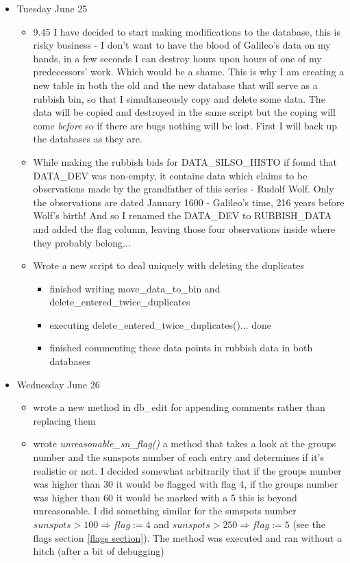 \documentclass[12pt]{article}
\begin{document}
\begin{itemize}
\begin{itemize}
    \end{itemize}
    \item Tuesday June 25
    \begin{itemize}
        \item 9.45 I have decided to start making modifications to the database, this is risky business - I don't want to have the blood of Galileo's data on my hands, in a few seconds I can destroy hours upon hours of one of my predecessors' work. Which would be a shame. This is why I am creating a new table in both the old and the new database that will serve as a rubbish bin, so that I simultaneously copy and delete some data. The data will be copied and destroyed in the same script but the coping will come \textit{before} so if there are bugs nothing will be lost. First I will back up the databases as they are.
        \item While making the rubbish bids for DATA\_SILSO\_HISTO if found that DATA\_DEV was non-empty, it contains data which claims to be observations made by the grandfather of this series - Rudolf Wolf. Only the observations are dated January 1600 - Galileo's time, 216 years before Wolf's birth! And so I renamed the DATA\_DEV to RUBBISH\_DATA and added the flag column, leaving those four observations inside where they probably belong...
        \item Wrote a new script to deal uniquely with deleting the duplicates
        \begin{itemize}
            \item finished writing move\_data\_to\_bin and delete\_entered\_twice\_duplicates
            \item executing delete\_entered\_twice\_duplicates()... done
            \item finished commenting these data points in rubbish data in both databases
        \end{itemize}
    \end{itemize}
    \item Wednesday June 26
    \begin{itemize}
        \item wrote a new method in db\_edit for appending comments rather than replacing them
        \item wrote \textit{unreasonable\_sn\_flag()} a method that takes a look at the groups number and the sunspots number of each entry and determines if it's realistic or not. I decided somewhat arbitrarily that if the groups number was higher than 30 it would be flagged with flag 4, if the groups number was higher than 60 it would be marked with a 5 this is beyond unreasonable. I did something similar for the sunspots number $sunspots>100\Rightarrow flag:=4$ and $sunspots>250\Rightarrow flag:=5$ (see the flags section \ref{flags section}). The method was executed and ran without a hitch (after a bit of debugging)

\end{itemize}
\end{itemize}
\end{document}
